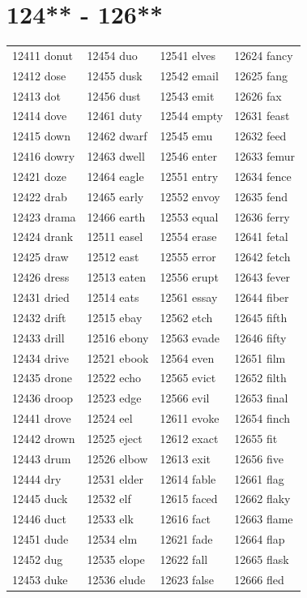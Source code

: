\documentclass[10pt, oneside]{book}
\begin{document}
\begin{table}
	\centering
	\section*{124** - 126**}
	\begin{tabular}{l l l l}
12411 donut &12454 duo &12541 elves &12624 fancy\\
12412 dose &12455 dusk &12542 email &12625 fang\\
12413 dot &12456 dust &12543 emit &12626 fax\\
12414 dove &12461 duty &12544 empty &12631 feast\\
12415 down &12462 dwarf &12545 emu &12632 feed\\
12416 dowry &12463 dwell &12546 enter &12633 femur\\
12421 doze &12464 eagle &12551 entry &12634 fence\\
12422 drab &12465 early &12552 envoy &12635 fend\\
12423 drama &12466 earth &12553 equal &12636 ferry\\
12424 drank &12511 easel &12554 erase &12641 fetal\\
12425 draw &12512 east &12555 error &12642 fetch\\
12426 dress &12513 eaten &12556 erupt &12643 fever\\
12431 dried &12514 eats &12561 essay &12644 fiber\\
12432 drift &12515 ebay &12562 etch &12645 fifth\\
12433 drill &12516 ebony &12563 evade &12646 fifty\\
12434 drive &12521 ebook &12564 even &12651 film\\
12435 drone &12522 echo &12565 evict &12652 filth\\
12436 droop &12523 edge &12566 evil &12653 final\\
12441 drove &12524 eel &12611 evoke &12654 finch\\
12442 drown &12525 eject &12612 exact &12655 fit\\
12443 drum &12526 elbow &12613 exit &12656 five\\
12444 dry &12531 elder &12614 fable &12661 flag\\
12445 duck &12532 elf &12615 faced &12662 flaky\\
12446 duct &12533 elk &12616 fact &12663 flame\\
12451 dude &12534 elm &12621 fade &12664 flap\\
12452 dug &12535 elope &12622 fall &12665 flask\\
12453 duke &12536 elude &12623 false &12666 fled\\
	\end{tabular}
 \end{table}
\clearpage
\end{document}
